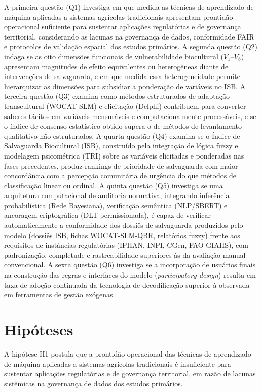 A primeira questão (Q1) investiga em que medida as técnicas de aprendizado de máquina aplicadas a sistemas agrícolas tradicionais apresentam prontidão operacional suficiente para sustentar aplicações regulatórias e de governança territorial, considerando as lacunas na governança de dados, conformidade FAIR e protocolos de validação espacial dos estudos primários. A segunda questão (Q2) indaga se as oito dimensões funcionais de vulnerabilidade biocultural ($V_{1}$--$V_{8}$) apresentam magnitudes de efeito equivalentes ou heterogêneas diante de intervenções de salvaguarda, e em que medida essa heterogeneidade permite hierarquizar as dimensões para subsidiar a ponderação de variáveis no ISB. A terceira questão (Q3) examina como métodos estruturados de adaptação transcultural (WOCAT-SLM) e elicitação (Delphi) contribuem para converter saberes tácitos em variáveis mensuráveis e computacionalmente processáveis, e se o índice de consenso estatístico obtido supera o de métodos de levantamento qualitativo não estruturados. A quarta questão (Q4) examina se o Índice de Salvaguarda Biocultural (ISB), construído pela integração de lógica fuzzy e modelagem psicométrica (TRI) sobre as variáveis elicitadas e ponderadas nas fases precedentes, produz rankings de prioridade de salvaguarda com maior concordância com a percepção comunitária de urgência do que métodos de classificação linear ou ordinal. A quinta questão (Q5) investiga se uma arquitetura computacional de auditoria normativa, integrando inferência probabilística (Rede Bayesiana), verificação semântica (NLP/SBERT) e ancoragem criptográfica (DLT permissionada), é capaz de verificar automaticamente a conformidade dos dossiês de salvaguarda produzidos pelo modelo (dossiês ISB, fichas WOCAT-SLM-QBR, relatórios fuzzy) frente aos requisitos de instâncias regulatórias (IPHAN, INPI, CGen, FAO-GIAHS), com padronização, completude e rastreabilidade superiores às da avaliação manual convencional. A sexta questão (Q6) investiga se a incorporação de usuários finais na construção das regras e interfaces do modelo (\textit{participatory design}) resulta em taxa de adoção continuada da tecnologia de decodificação superior à observada em ferramentas de gestão exógenas.


\section{Hipóteses}

A hipótese H1 postula que a prontidão operacional das técnicas de aprendizado de máquina aplicadas a sistemas agrícolas tradicionais é insuficiente para sustentar aplicações regulatórias e de governança territorial, em razão de lacunas sistêmicas na governança de dados dos estudos primários.

